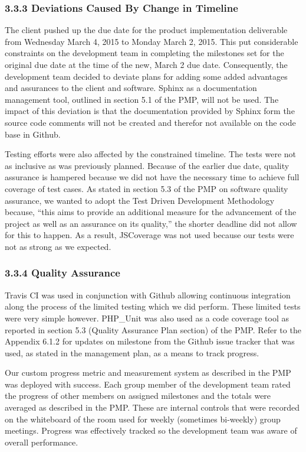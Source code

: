 \documentclass[]{article}
\begin{document}
\subsubsection{3.3.3 Deviations Caused By Change in
Timeline}\label{deviations-caused-by-change-in-timeline}

The client pushed up the due date for the product implementation
deliverable from Wednesday March 4, 2015 to Monday March 2, 2015. This
put considerable constraints on the development team in completing the
milestones set for the original due date at the time of the new, March 2
due date. Consequently, the development team decided to deviate plans
for adding some added advantages and assurances to the client and
software. Sphinx as a documentation management tool, outlined in section
5.1 of the PMP, will not be used. The impact of this deviation is that
the documentation provided by Sphinx form the source code comments will
not be created and therefor not available on the code base in Github.

Testing efforts were also affected by the constrained timeline. The
tests were not as inclusive as was previously planned. Because of the
earlier due date, quality assurance is hampered because we did not have
the necessary time to achieve full coverage of test cases. As stated in
section 5.3 of the PMP on software quality assurance, we wanted to adopt
the Test Driven Development Methodology because, ``this aims to provide
an additional measure for the advancement of the project as well as an
assurance on its quality,'' the shorter deadline did not allow for this
to happen. As a result, JSCoverage was not used because our tests were
not as strong as we expected.

\subsubsection{3.3.4 Quality Assurance}\label{quality-assurance}

Travis CI was used in conjunction with Github allowing continuous
integration along the process of the limited testing which we did
perform. These limited tests were very simple however. PHP\_Unit was
also used as a code coverage tool as reported in section 5.3 (Quality
Assurance Plan section) of the PMP. Refer to the Appendix 6.1.2 for
updates on milestone from the Github issue tracker that was used, as
stated in the management plan, as a means to track progress.

Our custom progress metric and measurement system as described in the
PMP was deployed with success. Each group member of the development team
rated the progress of other members on assigned milestones and the
totals were averaged as described in the PMP. These are internal
controls that were recorded on the whiteboard of the room used for
weekly (sometimes bi-weekly) group meetings. Progress was effectively
tracked so the development team was aware of overall performance.
\end{document}
